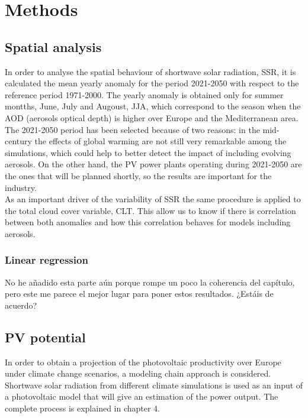 \section{Methods}

\subsection{Spatial analysis}

In order to analyse the spatial behaviour of shortwave solar radiation, SSR, it is calculated the mean yearly anomaly for the period 2021-2050 with respect to the reference period 1971-2000. The yearly anomaly is obtained only for summer montths, June, July and Augoust, JJA, which correspond to the season when the AOD (aerosols optical depth) is higher over Europe and the Mediterranean area.\\

The 2021-2050 period has been selected because of two reasons: in the mid-century the effects of global warming are not still very remarkable among the simulations, which could help to better detect the impact of including evolving aerosols. On the other hand, the PV power plants operating during 2021-2050 are the ones that will be planned shortly, so the results are important for the industry.\\

As an important driver of the variability of SSR the same procedure is applied to the total cloud cover variable, CLT. This allow us to know if there is correlation between both anomalies and how this correlation behaves for models including aerosols.\\

\subsubsection{Linear regression}

{\color{red} No he añadido esta parte aún porque rompe un poco la coherencia del capítulo, pero este me parece el mejor lugar para poner estos resultados. ¿Estáis de acuerdo?}

\subsection{PV potential}

In order to obtain a projection of the photovoltaic productivity over Europe under climate change scenarios, a modeling chain approach is considered. Shortwave solar radiation from different climate simulations is used as an input of a photovoltaic model that will give an estimation of the power output. The complete process is explained in chapter 4.\\

